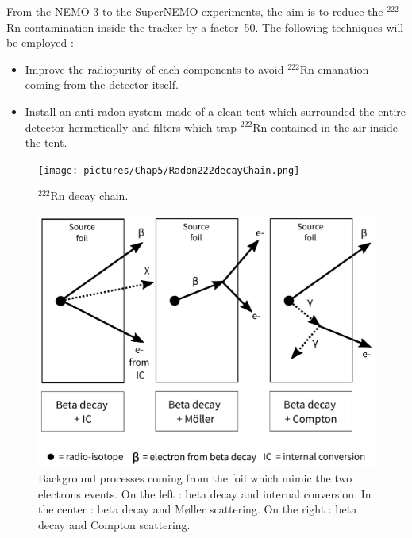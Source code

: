 \documentclass[main.tex]{subfiles}
\begin{document}
\bigskip


\noindent From the NEMO-3 to the SuperNEMO experiments, the aim is to reduce the $^{\text{222}}$Rn contamination inside the tracker by a factor~50. The following techniques will be employed :


\begin{itemize}

\item Improve the radiopurity of each components to avoid $^{\text{222}}$Rn emanation coming from the detector itself.

\item Install an anti-radon system made of a clean tent which surrounded the entire detector hermetically and filters which trap $^{\text{222}}$Rn contained in the air inside the tent. 

\end{itemize}


\begin{figure}[h!]
\begin{center}
\texttt{[image: pictures/Chap5/Radon222decayChain.png]}
\caption{$^{\text{222}}$Rn decay chain.}
\label{Radon222decayChain}
\end{center}
\end{figure}


\begin{figure}[h!]
\begin{center}
\includegraphics[scale=0.4]{pictures/Chap5/internal_bkg.pdf}
\caption{Background processes coming from the foil which mimic the two electrons events. On the left : beta decay and internal conversion. In the center : beta decay and M\o ller scattering. On the right : beta decay and Compton scattering.}
\label{Backgroungs}
\end{center}
\end{figure}
\end{document}
